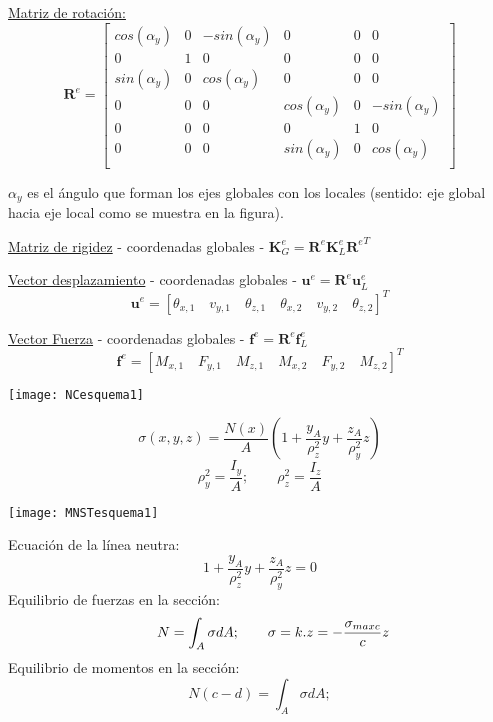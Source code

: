 \underline{Matriz de rotación:}
\renewcommand{\arraystretch}{1.1}
\[
\textbf{R}^e = 
\left[
\begin{matrix}
cos(\alpha_y) & 0 & -sin(\alpha_y) & 0 & 0 & 0 \\
0 & 1 & 0 & 0 & 0 & 0 \\
sin(\alpha_y)  & 0 & cos(\alpha_y)  & 0 & 0 & 0 \\
0 & 0 & 0 & cos(\alpha_y)  & 0 & -sin(\alpha_y) \\
0 & 0 & 0 & 0 & 1 & 0 \\
0 & 0 & 0 & sin(\alpha_y) & 0 & cos(\alpha_y) \\
\end{matrix}
\right]
\]


$\alpha_y$ es el ángulo que forman los ejes globales con los locales (sentido: eje global hacia eje local como se muestra en la figura).

\vspace{0.3cm}
\underline{Matriz de rigidez} - coordenadas globales - $\textbf{K}_G^e=\textbf{R}^e\textbf{K}_L^e{\textbf{R}^e}^T$

\vspace{0.3cm}
\underline{Vector desplazamiento} - coordenadas globales - $\textbf{u}^e=\textbf{R}^e\textbf{u}^e_L$
$$
\textbf{u}^e=[\theta_{x,1} \quad v_{y,1} \quad \theta_{z,1} \quad \theta_{x,2} \quad v_{y,2} \quad \theta_{z,2}]^T
$$

\vspace{0.3cm}
\underline{Vector Fuerza} - coordenadas globales - $\textbf{f}^e=\textbf{R}^e\textbf{f}^e_L$
$$
\textbf{f}^e=[M_{x,1} \quad F_{y,1}\quad M_{z,1}\quad M_{x,2} \quad F_{y,2} \quad M_{z,2}]^T
$$

\begin{center}
\end{center}

\begin{minipage}{0.33\textwidth}
	\texttt{[image: NCesquema1]}
\end{minipage}
\begin{minipage}{0.66\textwidth}
	$$
	\sigma(x,y,z)=\frac{N(x)}{A} \left (1+\frac{y_A}{\rho_z^2}y +\frac{z_A}{\rho_y^2}z\right)
	$$
	$$
	\rho_y^2=\frac{I_y}{A} ;
	\qquad
	\rho_z^2=\frac{I_z}{A}
	$$
\end{minipage}

\vspace{0.7cm}
\begin{minipage}{0.33\textwidth}
	\texttt{[image: MNSTesquema1]}
\end{minipage}
\begin{minipage}{0.66\textwidth}
	\hspace{0.7cm}
	Ecuación de la línea neutra:
	$$
	1 +\frac{y_A}{\rho_z^2}y +\frac{z_A}{\rho_y^2}z=0
	$$
	\hspace{0.7cm}
	Equilibrio de fuerzas en la sección:
	$$
	\hspace{0.7cm}
	N=\int_{A} \sigma dA ;
	\qquad
	\sigma= k.z= -\frac{\sigma_{maxc}}{c} z
	$$
	\hspace{0.7cm}
	Equilibrio de momentos en la sección:
	$$
	N (c-d)=\int_{A} \sigma dA ;
	$$
\end{minipage}


